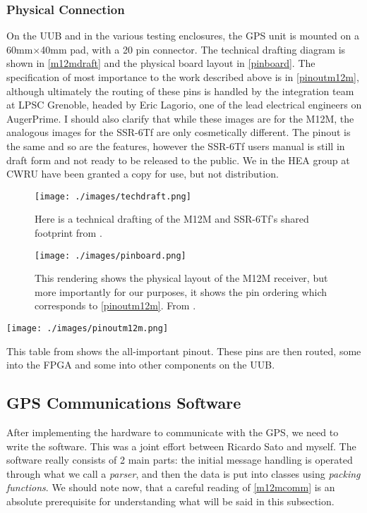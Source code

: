\subsubsection{Physical Connection}
On the UUB and in the various testing enclosures, the GPS unit is mounted on a 60mm$\times$40mm pad, with a 20 pin connector. The technical drafting diagram is shown in \autoref{m12mdraft} and the physical board layout in \autoref{pinboard}. The specification of most importance to the work described above is in \autoref{pinoutm12m}, although ultimately the routing of these pins is handled by the integration team at LPSC Grenoble, headed by Eric Lagorio, one of the lead electrical engineers on AugerPrime. I should also clarify that while these images are for the M12M, the analogous images for the SSR-6Tf are only cosmetically different. The pinout is the same and so are the features, however the SSR-6Tf users manual is still in draft form and not ready to be released to the public. We in the HEA group at CWRU have been granted a copy for use, but not distribution.
\begin{figure}[h!]
\centering
\texttt{[image: ./images/techdraft.png]}
\caption[M12M Footprint Technical Draft]{Here is a technical drafting of the M12M and SSR-6Tf's shared footprint from \textcite{m12muser}.}
\label{m12mdraft}
\end{figure}
\begin{figure}[h!]
\centering
\texttt{[image: ./images/pinboard.png]}
\caption[M12M Physical Board Layout]{This rendering shows the physical layout of the M12M receiver, but more importantly for our purposes, it shows the pin ordering which corresponds to \autoref{pinoutm12m}. From \textcite{m12muser}.}
\label{pinboard}
\end{figure}
\begin{table}[h!]
\centering
\texttt{[image: ./images/pinoutm12m.png]}
\caption[M12M/SSR-6Tf Header Pinout]{This table from \textcite{m12muser} shows the all-important pinout. These pins are then routed, some into the FPGA and some into other components on the UUB.}
\label{pinoutm12m}
\end{table}

\subsection{GPS Communications Software}
After implementing the hardware to communicate with the GPS, we need to write the software. This was a joint effort between Ricardo Sato and myself. The software really consists of 2 main parts: the initial message handling is operated through what we call a \textit{parser}, and then the data is put into classes using \textit{packing functions}. We should note now, that a careful reading of \autoref{m12mcomm} is an absolute prerequisite for understanding what will be said in this subsection.
